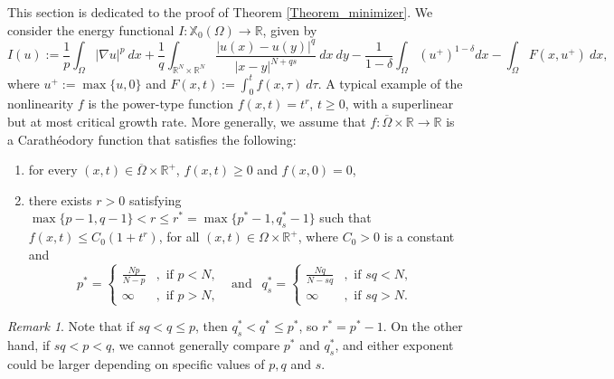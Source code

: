 \documentclass[reqno,oneside]{amsart}
\theoremstyle{definition}
\theoremstyle{remark}
\newtheorem{remark}[theorem]{Remark}
\numberwithin{equation}{section}
\newcommand{\Om} {\Omega}
\newcommand{\sr}{\mathbb{R}}
\newcommand{\rar}{\rightarrow}
\newcommand{\na} {\nabla}
\newcommand{\xo}{\mathbb{X}_0}
\begin{document}
This section is dedicated to the proof of Theorem \ref{Theorem_minimizer}. We consider the energy functional $I: \xo(\Om) \rar \sr$, given by
\begin{equation*}
    I(u):=\frac{1}{p} \int_{\Om} |\na u|^p\ dx + \frac{1}{q} \int_{\sr^N \times \sr^N} \frac{|u(x)- u(y)|^q}{|x-y|^{N+qs}}\ dx\ dy - \frac{1}{1-\delta} \int_{\Om} \left(u^+ \right)^{1-\delta} dx - \int_{\Om} F \left(x, u^+ \right)\ dx,
\end{equation*}
where $\displaystyle u^+ := \max \{u, 0\}$ and $\displaystyle F(x,t):= \int_0^t f(x,\tau)\ d\tau$. A typical example of the nonlinearity $f$ is the power-type function $f(x,t)= t^r$, $t\geq 0$, with a superlinear but at most critical growth rate. More generally, we assume that $f: \overline{\Om} \times \sr \rar \sr$ is a Carath\'eodory function that satisfies the following:
\begin{enumerate}
    \item[\textit{(f1)}] for every $(x,t)\in \overline{\Om} \times \sr^+$, $f(x,t) \geq 0$ and $f(x,0)=0$,
    \item[\textit{(f2)}] there exists $r>0$ satisfying $\max \{p-1, q-1\} <r \leq r^* =\max\{ p^* -1, q_s^* -1 \}$ such that $f(x,t) \leq C_0 (1+t^r)$, for all $(x,t)\in \Om \times \sr^+$, where $C_0 >0$ is a constant and
    \[p^* = \begin{cases}
    \frac{Np}{N-p}&, \text{ if } p<N,\\
    \infty&, \text{ if } p>N,
    \end{cases}\ \ \text{ and }\ \ q_s^* = \begin{cases}
    \frac{Nq}{N-sq}&, \text{ if } sq<N,\\
    \infty&, \text{ if } sq>N.
    \end{cases}\]
\end{enumerate}

\begin{remark}\label{bigger_exponent}
    Note that if $sq<q \leq p$, then $q_s^* < q^* \leq p^*$, so $r^* = p^* -1$. On the other hand, if $sq < p <q$, we cannot generally compare $p^*$ and $q_s^*$, and either exponent could be larger depending on specific values of $p,q$ and $s$.
\end{remark}
\end{document}
